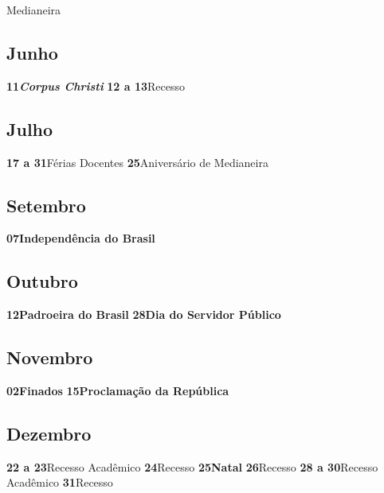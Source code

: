 \documentclass[thesis]{hmcposter}
\begin{document}
\begin{poster}
Medianeira \newline\subsection{Junho}\textbf{11}\quad \quad \quad \quad \textbf{\textit{Corpus Christi}} \newline\textbf{12 a 13}\quad \quad Recesso \newline\subsection{Julho}\textbf{17 a 31}\quad \quad Férias Docentes \newline\textbf{25}\quad \quad \quad \quad Aniversário de Medianeira \newline\subsection{Setembro}\textbf{07}\quad \quad \quad \quad \textbf{Independência do Brasil} \newline\subsection{Outubro}\textbf{12}\quad \quad \quad \quad \textbf{Padroeira do Brasil} \newline\textbf{28}\quad \quad \quad \quad \textbf{Dia do Servidor Público} \newline\subsection{Novembro}\textbf{02}\quad \quad \quad \quad \textbf{Finados} \newline\textbf{15}\quad \quad \quad \quad \textbf{Proclamação da República} \newline\subsection{Dezembro}\textbf{22 a 23}\quad \quad Recesso Acadêmico \newline\textbf{24}\quad \quad \quad \quad Recesso \newline\textbf{25}\quad \quad \quad \quad \textbf{Natal} \newline\textbf{26}\quad \quad \quad \quad Recesso \newline\textbf{28 a 30}\quad \quad Recesso Acadêmico \newline\textbf{31}\quad \quad \quad \quad Recesso \newline\newpage

\end{poster}
\end{document}
